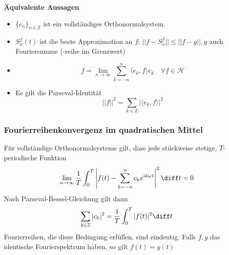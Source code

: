 \begin{sectionbox}
    \textbf{Äquivalente Aussagen}
    \begin{itemize}
        \item $\{e_n\}_{n\in\mathbb Z}$ ist ein vollständiges Orthonormalsystem.
        \item $S_n^f(t)$ ist die beste Approximation an $f$: $||f-S_n^f|| \le ||f-g||, g$ auch Fouriersumme (-reihe im Grenzwert)
        \item \begin{equation*}
                  f = \lim_{n\rightarrow\infty}\sum_{k=-n}^{n}\langle e_k, f\rangle e_k \quad \forall f \in \mathcal H
              \end{equation*}
        \item Es gilt die Parseval-Identität
              \begin{equation*}
                  ||f||^2 = \sum_{k\in\mathbb Z}|\langle e_k, f\rangle|^2
              \end{equation*}
    \end{itemize}
\end{sectionbox}

\begin{sectionbox}
    \subsubsection{Fourierreihenkonvergenz im quadratischen Mittel}
    Für vollständige Orthonormalsysteme gilt, dass jede stückweise stetige, $T$-periodische Funktion
    \begin{equation*}
        \lim_{n\rightarrow\infty}\frac{1}{T}\int_0^T\left|f(t) - \sum_{k=-n}^{n}c_ke^{ik\omega t}\right|^2\diff t = 0
    \end{equation*}
    Nach Parseval-Bessel-Gleichung gilt dann
    \begin{equation*}
        \sum_{k\in\mathbb Z}|c_k|^2 = \frac{1}{T}\int_0^T|f(t)|^2\diff t
    \end{equation*}
    Fourierreihen, die diese Bedingung erfüllen, sind eindeutig. Falls $f,g$ das identische Fourierspektrum haben, so gilt $f(t)=g(t)$
\end{sectionbox}
